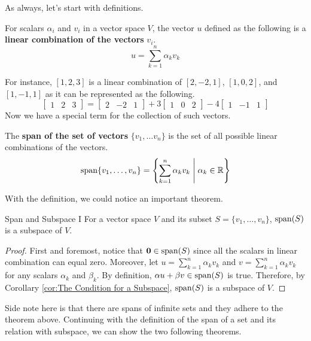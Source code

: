 \documentclass[../main.tex]{subfiles}
\begin{document}
As always, let's start with definitions.

\begin{definition}{}{}
For scalars $\alpha_i$ and $v_i$ in a vector space $V$, the vector
$u$ defined as the following is a \textbf{linear combination of the
vectors} $v_i$.
\[
u = \sum_{k = 1}^n \alpha_k v_k
\]
\end{definition}

For instance, $[1, 2, 3]$ is a linear combination of $[2, -2, 1]$,
$[1, 0, 2]$, and $[1, -1, 1]$ as it can be represented as the
following.
\[
\begin{bmatrix}
    1 & 2 & 3
\end{bmatrix}
=
\begin{bmatrix}
    2 & -2 & 1
\end{bmatrix}
+
3\begin{bmatrix}
    1 & 0 & 2
\end{bmatrix}
-
4\begin{bmatrix}
    1 & -1 & 1
\end{bmatrix}
\]
Now we have a special term for the collection of such vectors.

\begin{definition}{}{}
The \textbf{span of the set of vectors} $\{ v_1, \ldots v_n \}$ is
the set of all possible linear combinations of the vectors.
\[
\operatorname{span}\{v_1, \ldots, v_n\}
= \left\{
    \sum_{k = 1}^n \alpha_k v_k \; \middle|\; \alpha_k \in \mathbb{R}
\right\}
\]
\end{definition}

With the definition, we could notice an important theorem.

\begin{theorem}{}{Span and Subspace I}
For a vector space $V$ and its subset $S = \{ v_1, \ldots, v_n \}$,
$\operatorname{span}(S)$ is a subspace of $V$.
\end{theorem}
\begin{proof}
First and foremost, notice that $\mathbf{0} \in \operatorname{span}(S)$ since all
the scalars in linear combination can equal zero. Moreover, let $u =
\sum_{k = 1}^n \alpha_k v_k$ and $v = \sum_{k = 1}^n \alpha_k v_k$ for
any scalars $\alpha_k$ and $\beta_k$. By definition, $\alpha u +
\beta v \in \operatorname{span}(S)$ is true. Therefore, by Corollary
\ref{cor:The Condition for a Subspace}, $\operatorname{span}(S)$ is a subspace of
$V$.
\end{proof}

Side note here is that there are spans of infinite sets and they
adhere to the theorem above. Continuing with the definition of the
span of a set and its relation with subspace, we can show the two
following theorems.
\end{document}
